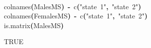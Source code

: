 \documentclass[a4paper]{article}
\newcommand{\hlfunctioncall}[1]{\textcolor[rgb]{1,0,0}{#1}}%
\newcommand{\hlstring}[1]{\textcolor[rgb]{0.6,0.6,1}{#1}}%
\newcommand{\hlkeyword}[1]{\textcolor[rgb]{0,0,0}{\textbf{#1}}}%
\newcommand{\hlassignement}[1]{\textcolor[rgb]{0.215686274509804,0.215686274509804,0.384313725490196}{\textbf{#1}}}%
\newcommand{\hlsymbol}[1]{\textcolor[rgb]{0,0,0}{#1}}%
\newcommand{\hlprompt}[1]{\textcolor[rgb]{0,0,0}{#1}}%
\newcommand{\hlstd}[1]{\textcolor[rgb]{0,0,0}{#1}}%
\newenvironment{Houtput}{\raggedright}{%
%
}
\renewenvironment{Schunk}{\vspace{\topsep}}{\vspace{\topsep}}
\begin{document}
\begin{Houtput}
\normalfont
\hspace*{\fill}\\
\hlstd{}\ttfamily\noindent
\hlprompt{\usebox{\hlnormalsizeboxgreaterthan}{\ }}\hlfunctioncall{colnames}\hlkeyword{(}\hlsymbol{MalesMS}\hlkeyword{)}{\ }\hlassignement{\usebox{\hlnormalsizeboxlessthan}-}{\ }\hlfunctioncall{c}\hlkeyword{(}\hlstring{"state{\ }1"}\hlkeyword{,}{\ }\hlstring{"state{\ }2"}\hlkeyword{)}\mbox{}
\normalfont
\hspace*{\fill}\\
\hlstd{}\ttfamily\noindent
\hlprompt{\usebox{\hlnormalsizeboxgreaterthan}{\ }}\hlfunctioncall{colnames}\hlkeyword{(}\hlsymbol{FemalesMS}\hlkeyword{)}{\ }\hlassignement{\usebox{\hlnormalsizeboxlessthan}-}{\ }\hlfunctioncall{c}\hlkeyword{(}\hlstring{"state{\ }1"}\hlkeyword{,}{\ }\hlstring{"state{\ }2"}\hlkeyword{)}\mbox{}
\normalfont
\hspace*{\fill}\\
\hlstd{}\ttfamily\noindent
\hlprompt{\usebox{\hlnormalsizeboxgreaterthan}{\ }}\hlfunctioncall{is.matrix}\hlkeyword{(}\hlsymbol{MalesMS}\hlkeyword{)}\mbox{}
\normalfont
\hspace*{\fill}\\
\hlstd{}\begin{Schunk}
\begin{Soutput}
[1] TRUE
\end{Soutput}

\end{Schunk}
\end{Houtput}
\end{document}
